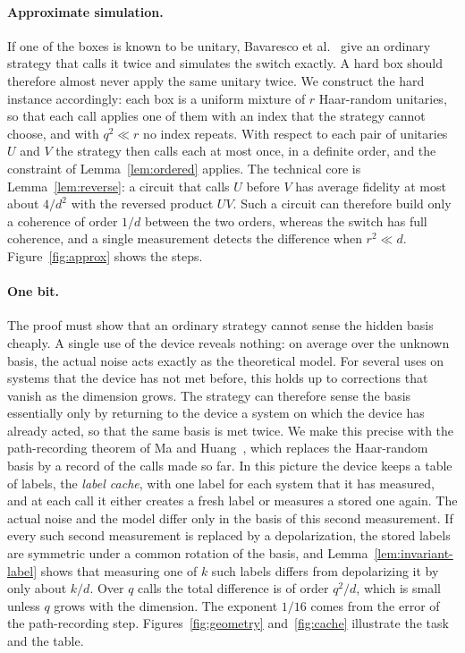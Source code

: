 \documentclass[11pt,letterpaper]{article}
\theoremstyle{definition}\newtheorem{definition}[theorem]{Definition}
\newcommand{\reffig}[1]{Figure~\ref{#1}}
\begin{document}
\paragraph{Approximate simulation.}
If one of the boxes is known to be unitary, Bavaresco et
al.~\cite[Theorem~1]{bavaresco2025} give an ordinary strategy that
calls it twice and simulates the switch exactly. A hard box should therefore
almost never apply the same unitary twice. We construct the hard instance
accordingly: each box is a uniform mixture of $r$ Haar-random
unitaries, so that each call applies one of them with an index that the
strategy cannot choose, and with $q^2\ll r$ no index repeats. With
respect to each pair of unitaries $U$ and $V$ the strategy then calls
each at most once, in a definite order, and the constraint of
Lemma~\ref{lem:ordered} applies. The technical core is
Lemma~\ref{lem:reverse}: a circuit that calls $U$ before $V$ has
average fidelity at most about $4/d^2$ with the reversed product $UV$.
Such a circuit can therefore build only a coherence of order $1/d$
between the two orders, whereas the switch has full coherence, and a
single measurement detects the difference when $r^2\ll d$.
\reffig{fig:approx} shows the steps.

\paragraph{One bit.}
The proof must show that an ordinary strategy cannot sense the hidden
basis cheaply. A single use of the device reveals nothing: on average
over the unknown basis, the actual noise acts exactly as the
theoretical model. For several uses on systems that the device has not
met before, this holds up to corrections that vanish as the dimension
grows. The strategy can therefore sense the basis essentially only by
returning to the device a system on which the device has already
acted, so that the same basis is met twice. We make this precise with
the path-recording theorem of Ma and Huang~\cite{mahuang2025}, which
replaces the Haar-random basis by a record of the calls made so far. In
this picture the device keeps a table of labels, the \emph{label
cache}, with one label for each system that it has measured, and at each call it either creates a fresh label
or measures a stored one again. The actual noise and the model differ
only in the basis of this second measurement. If every such second
measurement is replaced by a depolarization, the stored labels are
symmetric under a common rotation of the basis, and
Lemma~\ref{lem:invariant-label} shows that measuring one of $k$ such
labels differs from depolarizing it by only about $k/d$. Over $q$ calls
the total difference is of order $q^2/d$, which is small unless $q$
grows with the dimension. The exponent $1/16$ comes from the error of
the path-recording step. Figures~\ref{fig:geometry}
and~\ref{fig:cache} illustrate the task and the table.
\end{document}
